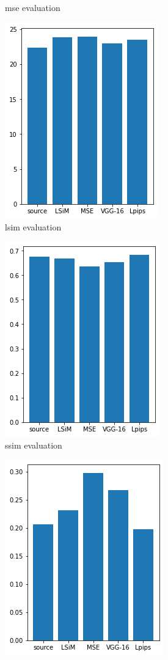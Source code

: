 \documentclass[a4paper,12pt,twoside]{report}
\begin{document}
\begin{figure}
\begin{subfigure}{0.32\textwidth}
		\caption{mse evaluation}
	\end{subfigure}
	\begin{subfigure}{0.32\textwidth}
		\centering
		\includegraphics[scale=0.48]{buoyancy_test/lsim.png}
		\caption{lsim evaluation}
	\end{subfigure}
	\begin{subfigure}{0.32\textwidth}
		\centering
		\includegraphics[scale=0.48]{buoyancy_test/ssim.png}
		\caption{ssim evaluation}
	\end{subfigure}
	\begin{subfigure}{0.32\textwidth}
		\centering
		\includegraphics[scale=0.48]{buoyancy_test/lpips.png}

\end{subfigure}
\end{figure}
\end{document}
